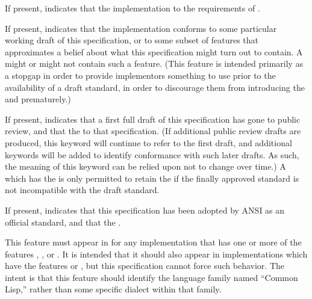 
If present, indicates that the implementation 
to the requirements of \IEEEFloatingPoint.


If present, indicates that the implementation conforms to some
particular working draft of this specification, 
or to some subset of features that approximates a belief about
what this specification might turn out to contain.
A  might or might not contain
such a feature.
(This feature is intended primarily as a stopgap in order to 
provide implementors something to use prior to the availability
of a draft standard, in order to discourage them from introducing
the  and   prematurely.)


If present, indicates that a first full draft of this specification
has gone to public review, and that the  
 to that specification.
(If additional public review drafts are produced, this keyword
 will continue to refer to the first draft, and additional keywords
 will be added to identify conformance with such later drafts.
 As such, the meaning of this keyword can be relied upon not to
 change over time.)
A  which has the 
 is only permitted to retain the  
 if the finally approved standard is not incompatible
with the draft standard.


If present, indicates that this specification has been adopted by ANSI
as an official standard, and that the  
.


This feature must appear in  for any implementation that
has one or more of the features , ,
or .  It is intended that it should also appear in
implementations which have the features  or ,
but this specification cannot force such behavior.  The intent is 
that this feature should identify the language family named ``Common Lisp,''
rather than some specific dialect within that family.

\endlist
{}

